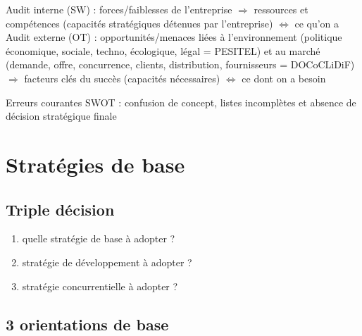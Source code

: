 		Audit interne (SW) : forces/faiblesses de l'entreprise $\Rightarrow$ ressources et compétences (capacités stratégiques détenues par l'entreprise) $\Leftrightarrow$ ce qu'on a \\
		
		Audit externe (OT) : opportunités/menaces liées à l'environnement (politique économique, sociale, techno, écologique, légal = PESITEL) et au marché (demande, offre, concurrence, clients, distribution, fournisseurs = DOCoCLiDiF) $\Rightarrow$ facteurs clés du succès (capacités nécessaires) $\Leftrightarrow$ ce dont on a besoin \\
	
	
	
		Erreurs courantes SWOT : confusion de concept, listes incomplètes et absence de décision stratégique finale
	
	
	\section{Stratégies de base}

		\subsection{Triple décision}
		
		\begin{enumerate}
			 \item quelle stratégie de base à adopter ?
			 \item stratégie de développement à adopter ?
			 \item stratégie concurrentielle à adopter ?
		\end{enumerate}		
		
		
		\subsection{3 orientations de base}
		
\begin{comment}	
		\begin{tabular}{|c|c|c|}
			\hline innovation & infrastructure & relation \\ 
			\hline rôle principal : nouveaux produits & logistique, stockage, production & clients, relation \\ 
			\hline clés du succès : vitesse, entrée précoce & échelles, répartition des coûts fixes & économie d'envergure (scope), part des clients \\ 
			\hline culture : centrée sur les travailleurs, stars créatives & orienté-coûts, standardisation, prévisibilité, efficience & orienté-cilent, importance du service \\ 
			\hline compétition : bataille pour les talents, faibles barrières entrée, petits acteurs & bataille pour la taille, consolidation rapide, grands acteurs & bataille pour l'envergure, consolidation rapide, grands acteurs \\ 
			\hline 
		\end{tabular}	
\end{comment}


